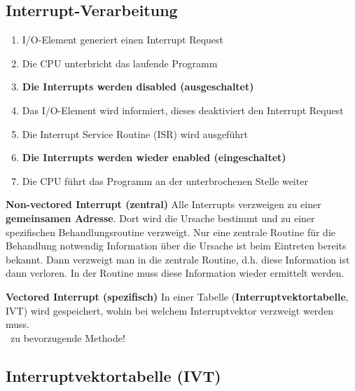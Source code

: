 \subsection{Interrupt-Verarbeitung}

\begin{enumerate}
    \item I/O-Element generiert einen Interrupt Request
    \item Die CPU unterbricht das laufende Programm
    \item \textbf{Die Interrupts werden disabled (ausgeschaltet)}
    \item Das I/O-Element wird informiert, dieses deaktiviert den Interrupt Request
    \item Die Interrupt Service Routine (ISR) wird ausgeführt
    \item \textbf{Die Interrupts werden wieder enabled (eingeschaltet)}
    \item Die CPU führt das Programm an der unterbrochenen Stelle weiter
\end{enumerate}



\begin{outline}
    \1 \textbf{Non-vectored Interrupt (zentral)}
        \2 Alle Interrupts verzweigen zu einer \textbf{gemeinsamen Adresse}. Dort wird die Ursache bestimmt und zu einer
            spezifischen Behandlungsroutine verzweigt.
        \2[+] Nur eine zentrale Routine für die Behandlung notwendig
        \2[-] Information über die Ursache ist beim Eintreten bereits bekannt. Dann
                verzweigt man in die zentrale Routine, d.h. diese Information ist dann verloren. In der Routine muss diese
                Information wieder ermittelt werden.
\end{outline}  

\columnbreak

\begin{outline}
    \1 \textbf{Vectored Interrupt (spezifisch)}
        \2 In einer Tabelle (\textbf{Interruptvektortabelle}, IVT) wird gespeichert, wohin bei welchem Interruptvektor
            verzweigt werden muss. \\
            \textrightarrow\ zu bevorzugende Methode!
\end{outline}


\subsection{Interruptvektortabelle (IVT)}

